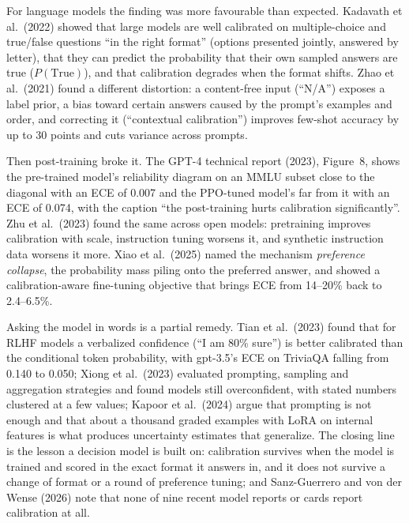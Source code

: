 \documentclass[11pt,letterpaper]{article}
\begin{document}
For language models the finding was more favourable than expected. Kadavath et al.\ (2022) showed that large models are well calibrated on multiple-choice and true/false questions ``in the right format'' (options presented jointly, answered by letter), that they can predict the probability that their own sampled answers are true ($P(\text{True})$), and that calibration degrades when the format shifts. Zhao et al.\ (2021) found a different distortion: a content-free input (``N/A'') exposes a label prior, a bias toward certain answers caused by the prompt's examples and order, and correcting it (``contextual calibration'') improves few-shot accuracy by up to 30 points and cuts variance across prompts.

Then post-training broke it. The GPT-4 technical report (2023), Figure~8, shows the pre-trained model's reliability diagram on an MMLU subset close to the diagonal with an ECE of 0.007 and the PPO-tuned model's far from it with an ECE of 0.074, with the caption ``the post-training hurts calibration significantly''. Zhu et al.\ (2023) found the same across open models: pretraining improves calibration with scale, instruction tuning worsens it, and synthetic instruction data worsens it more. Xiao et al.\ (2025) named the mechanism \emph{preference collapse}, the probability mass piling onto the preferred answer, and showed a calibration-aware fine-tuning objective that brings ECE from 14--20\% back to 2.4--6.5\%.

Asking the model in words is a partial remedy. Tian et al.\ (2023) found that for RLHF models a verbalized confidence (``I am 80\% sure'') is better calibrated than the conditional token probability, with gpt-3.5's ECE on TriviaQA falling from 0.140 to 0.050; Xiong et al.\ (2023) evaluated prompting, sampling and aggregation strategies and found models still overconfident, with stated numbers clustered at a few values; Kapoor et al.\ (2024) argue that prompting is not enough and that about a thousand graded examples with LoRA on internal features is what produces uncertainty estimates that generalize. The closing line is the lesson a decision model is built on: calibration survives when the model is trained and scored in the exact format it answers in, and it does not survive a change of format or a round of preference tuning; and Sanz-Guerrero and von der Wense (2026) note that none of nine recent model reports or cards report calibration at all.
\end{document}
